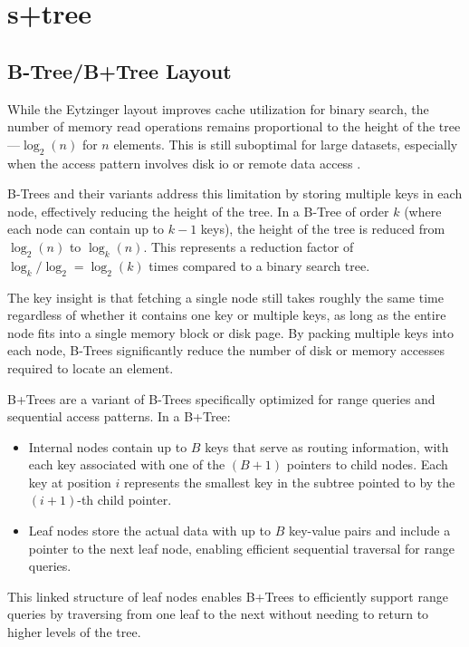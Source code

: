 \section{\texorpdfstring{\ac{s+tree}}{S+tree}}
\label{tb:static_btree}

\subsection{B-Tree/B+Tree Layout}
\label{tb:btree_layout}

While the Eytzinger layout improves cache utilization for binary search, the number of memory read operations remains proportional to the height of the tree—$\log_2(n)$ for $n$ elements. This is still suboptimal for large datasets, especially when the access pattern involves disk \ac{io} or remote data access \citep{static_b_trees}.

B-Trees and their variants address this limitation by storing multiple keys in each node, effectively reducing the height of the tree. In a B-Tree of order $k$ (where each node can contain up to $k-1$ keys), the height of the tree is reduced from $\log_2(n)$ to $\log_k(n)$. This represents a reduction factor of $\log_k/\log_2 = \log_2(k)$ times compared to a binary search tree.

The key insight is that fetching a single node still takes roughly the same time regardless of whether it contains one key or multiple keys, as long as the entire node fits into a single memory block or disk page. By packing multiple keys into each node, B-Trees significantly reduce the number of disk or memory accesses required to locate an element.

B+Trees are a variant of B-Trees specifically optimized for range queries and sequential access patterns. In a B+Tree:
\begin{itemize}
  \item Internal nodes contain up to $B$ keys that serve as routing information, with each key associated with one of the $(B+1)$ pointers to child nodes. Each key at position $i$ represents the smallest key in the subtree pointed to by the $(i+1)$-th child pointer.
  \item Leaf nodes store the actual data with up to $B$ key-value pairs and include a pointer to the next leaf node, enabling efficient sequential traversal for range queries.
\end{itemize}

This linked structure of leaf nodes enables B+Trees to efficiently support range queries by traversing from one leaf to the next without needing to return to higher levels of the tree.

